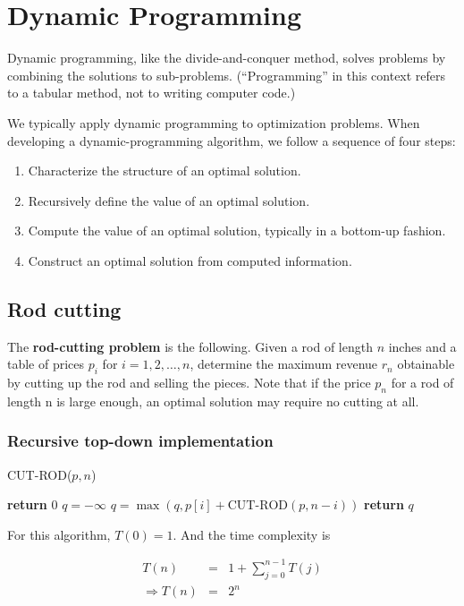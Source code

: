 \documentclass[12pt]{article}
\begin{document}
\section{Dynamic Programming}

Dynamic programming, like the divide-and-conquer method, solves problems by combining the solutions to sub-problems. (``Programming'' in this context refers to a tabular method, not to writing computer code.)

We typically apply dynamic programming to optimization problems. When developing a dynamic-programming algorithm, we follow a sequence of four steps:
\begin{enumerate}
  \item Characterize the structure of an optimal solution.
  \item Recursively define the value of an optimal solution.
  \item Compute the value of an optimal solution, typically in a bottom-up fashion.
  \item Construct an optimal solution from computed information.
\end{enumerate}

\subsection{Rod cutting}

The \textbf{rod-cutting problem} is the following. Given a rod of length $n$ inches and a table of prices $p_i$ for $i = 1, 2, \dots, n$, determine the maximum revenue $r_n$ obtainable by cutting up the rod and selling the pieces. Note that if the price $p_n$ for a rod of length n is large enough, an optimal solution may require no cutting at all.

\subsubsection*{Recursive top-down implementation}

CUT-ROD($p, n$)
\begin{algorithmic}[1]
	\State \textbf{return } $0$
\EndIf
\State $q = -\infty$
	\State $q = \max (q, p[i] + \text{CUT-ROD}(p, n-i))$
\EndFor
\State \textbf{return } $q$
\end{algorithmic}

For this algorithm, $T(0) = 1$. And the time complexity is

\begin{eqnarray*}
  T(n) &=& 1 + \sum_{j=0}^{n-1} {T(j)} \\
  \Rightarrow T(n) &=& 2^n
\end{eqnarray*}
\end{document}
